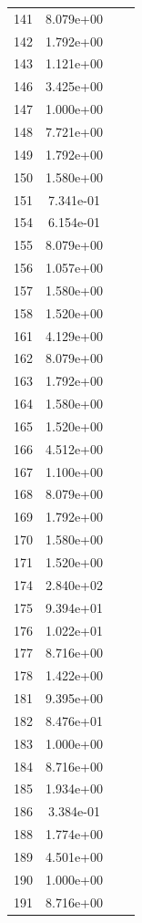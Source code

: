 \documentclass[12pt]{article}
\begin{document}
\begin{longtable}{@{}cccc@{}}
141 & 8.079e+00 &  &  \\
142 & 1.792e+00 &  &  \\
143 & 1.121e+00 &  &  \\
146 & 3.425e+00 &  &  \\
147 & 1.000e+00 &  &  \\
148 & 7.721e+00 &  &  \\
149 & 1.792e+00 &  &  \\
150 & 1.580e+00 &  &  \\
151 & 7.341e-01 &  &  \\
154 & 6.154e-01 &  &  \\
155 & 8.079e+00 &  &  \\
156 & 1.057e+00 &  &  \\
157 & 1.580e+00 &  &  \\
158 & 1.520e+00 &  &  \\
161 & 4.129e+00 &  &  \\
162 & 8.079e+00 &  &  \\
163 & 1.792e+00 &  &  \\
164 & 1.580e+00 &  &  \\
165 & 1.520e+00 &  &  \\
166 & 4.512e+00 &  &  \\
167 & 1.100e+00 &  &  \\
168 & 8.079e+00 &  &  \\
169 & 1.792e+00 &  &  \\
170 & 1.580e+00 &  &  \\
171 & 1.520e+00 &  &  \\
174 & 2.840e+02 &  &  \\
175 & 9.394e+01 &  &  \\
176 & 1.022e+01 &  &  \\
177 & 8.716e+00 &  &  \\
178 & 1.422e+00 &  &  \\
181 & 9.395e+00 &  &  \\
182 & 8.476e+01 &  &  \\
183 & 1.000e+00 &  &  \\
184 & 8.716e+00 &  &  \\
185 & 1.934e+00 &  &  \\
186 & 3.384e-01 &  &  \\
188 & 1.774e+00 &  &  \\
189 & 4.501e+00 &  &  \\
190 & 1.000e+00 &  &  \\
191 & 8.716e+00 &  &  \\

\end{longtable}
\end{document}

